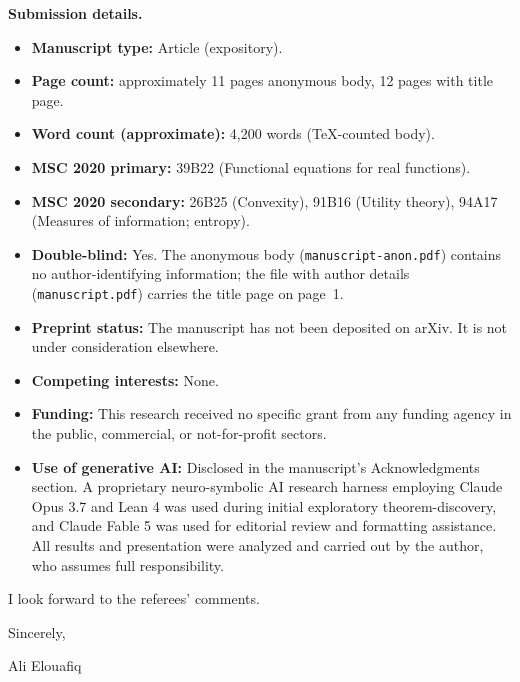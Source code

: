 \documentclass[12pt]{article}
\begin{document}
\bigskip
\noindent\textbf{Submission details.}
\begin{itemize}\setlength\itemsep{2pt}
  \item \textbf{Manuscript type:} Article (expository).
  \item \textbf{Page count:} approximately 11 pages anonymous body,
        12 pages with title page.
  \item \textbf{Word count (approximate):} 4{,}200 words (TeX-counted body).
  \item \textbf{MSC 2020 primary:} 39B22 (Functional equations for real functions).
  \item \textbf{MSC 2020 secondary:} 26B25 (Convexity), 91B16 (Utility theory),
        94A17 (Measures of information; entropy).
  \item \textbf{Double-blind:} Yes. The anonymous body
        (\texttt{manuscript-anon.pdf}) contains no author-identifying
        information; the file with author details
        (\texttt{manuscript.pdf}) carries the title page on page~1.
  \item \textbf{Preprint status:} The manuscript has not been deposited on
        arXiv. It is not under consideration elsewhere.
  \item \textbf{Competing interests:} None.
  \item \textbf{Funding:} This research received no specific grant from any
        funding agency in the public, commercial, or not-for-profit
        sectors.
  \item \textbf{Use of generative AI:} Disclosed in the manuscript's
        Acknowledgments section. A proprietary neuro-symbolic AI research
        harness employing Claude Opus 3.7 and Lean 4 was used during initial
        exploratory theorem-discovery, and Claude Fable 5 was used for editorial
        review and formatting assistance. All results and presentation were
        analyzed and carried out by the author, who assumes full responsibility.
\end{itemize}

\bigskip
\noindent
I look forward to the referees' comments.

\bigskip
\noindent
Sincerely,

\vspace{28pt}
\noindent
Ali Elouafiq
\end{document}
